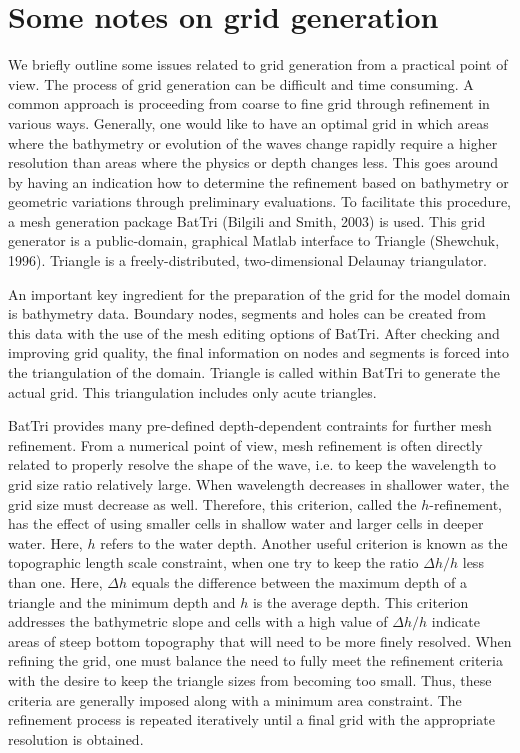 \documentclass[12pt]{book}
\begin{document}
\section{Some notes on grid generation}

We briefly outline some issues related to grid generation from a practical point of view.
The process of grid generation can be difficult and time consuming. A common approach is proceeding from coarse to fine grid through refinement in various ways.
Generally, one would like to have an optimal grid in which areas where the bathymetry or evolution of the waves change
rapidly require a higher resolution than areas where the physics or depth changes less.
This goes around by having an indication how to determine the refinement based on
bathymetry or geometric variations through preliminary evaluations.
To facilitate this procedure,
a mesh generation package BatTri (Bilgili and Smith, 2003) is used.
This grid generator is a public-domain, graphical Matlab interface to Triangle (Shewchuk, 1996).
Triangle is a freely-distributed, two-dimensional Delaunay triangulator.
\nocite{Bil03S,She96}

An important key ingredient for the preparation of the grid for the model domain is bathymetry data.
Boundary nodes, segments and holes
can be created from this data with the
use of the mesh editing options of BatTri.
After checking and improving grid quality, the final information on nodes and segments is forced into the
triangulation of the domain. Triangle is called within BatTri to generate
the actual grid. This triangulation includes only acute triangles.

BatTri provides many pre-defined depth-dependent contraints for further mesh refinement.
From a numerical point of view, mesh refinement is often directly related to properly resolve the shape of the wave,
i.e. to keep the wavelength to grid size ratio relatively large.
When wavelength decreases in shallower water, the grid size must decrease as well. Therefore, this criterion, called the $h$-refinement,
has the effect of using smaller cells in shallow water and larger
cells in deeper water. Here, $h$ refers to the water depth. Another useful criterion is known as the topographic length scale constraint,
when one try to keep the ratio $\Delta h/h$ less than one. Here, $\Delta h$ equals the difference between the maximum depth of a triangle and the minimum depth and
$h$ is the average depth. This
criterion addresses the bathymetric slope and cells with a high value of $\Delta h/h$ indicate areas of steep bottom topography that will need to be
more finely resolved.
When refining the grid, one must balance the need to fully meet the refinement criteria with the desire to keep the triangle sizes from becoming too small.
Thus, these criteria
are generally imposed along with a minimum area constraint.
The refinement process is repeated iteratively until a final grid with the appropriate resolution is obtained.
\end{document}
